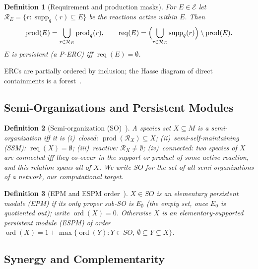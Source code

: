 \documentclass[11pt]{article}
\theoremstyle{plain}
\newtheorem{definition}{Definition}
\theoremstyle{remark}
\newcommand{\supp}{\operatorname{supp}}
\newcommand{\prods}{\operatorname{prod}}
\newcommand{\req}{\operatorname{req}}
\newcommand{\E}{\mathcal{E}}
\newcommand{\R}{\mathcal{R}}
\newcommand{\M}{M}
\newcommand{\SO}{\mathit{SO}}
\newcommand{\ord}{\operatorname{ord}}
\begin{document}
\begin{definition}[Requirement and production masks]
For $E \in \E$ let $\R_E = \{r : \supp_q(r) \subseteq E\}$ be the
reactions active within $E$. Then
\[
  \prods(E) = \bigcup_{r \in \R_E} \prods_q(r), \qquad
  \req(E) = \Bigl(\bigcup_{r \in \R_E} \supp_q(r)\Bigr) \setminus \prods(E).
\]
$E$ is \emph{persistent} (a P-ERC) iff $\req(E) = \emptyset$.
\end{definition}

ERCs are partially ordered by inclusion; the Hasse diagram of direct
containments is a forest~\cite{BMBcompanion}.

\subsection{Semi-Organizations and Persistent Modules}

\begin{definition}[Semi-organization (SO)~\cite{BMBcompanion}]
A species set $X \subseteq \M$ is a \emph{semi-organization} iff it is
(i)~\emph{closed}: $\prods(\R_X) \subseteq X$;
(ii)~\emph{semi-self-maintaining} (SSM): $\req(X) = \emptyset$;
(iii)~\emph{reactive}: $\R_X \neq \emptyset$;
(iv)~\emph{connected}: two species of $X$ are connected iff they co-occur
in the support or product of some active reaction, and this relation
spans all of $X$.
We write $\SO$ for the set of all semi-organizations of a network, our
computational target.
\end{definition}

\begin{definition}[EPM and ESPM order~\cite{BMBcompanion}]
\label{def:order}
$X \in \SO$ is an \emph{elementary persistent module} (EPM) if its only
proper sub-SO is $E_\emptyset$ (the empty set, once $E_0$ is quotiented
out); write $\ord(X)=0$. Otherwise $X$ is an \emph{elementary-supported
persistent module} (ESPM) of order
$\ord(X)=1+\max\{\ord(Y): Y \in \SO,\ \emptyset \subsetneq Y \subsetneq X\}$.
\end{definition}

\subsection{Synergy and Complementarity}
\end{document}
